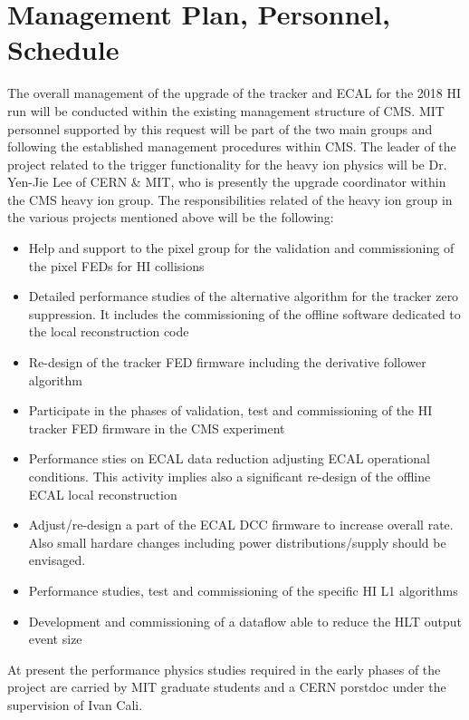 \section{Management Plan, Personnel, Schedule}
\label{sec:management}

The overall management of the upgrade of the tracker and ECAL for the 2018 HI run will be conducted within the existing management
structure of CMS. MIT personnel supported by this request will be part of the two main groups and following the
established management procedures within CMS. The leader of the project related to the trigger functionality for
the heavy ion physics will be Dr. Yen-Jie Lee of CERN \& MIT, who is presently the upgrade coordinator within the CMS
heavy ion group. 
The responsibilities related of the heavy ion group in the various projects mentioned above will be the following:

\begin{itemize}
\item Help and support to the pixel group for the validation and commissioning of the pixel FEDs for HI collisions 
\item Detailed performance studies of the alternative algorithm for the tracker zero suppression. It includes the
commissioning of the offline software dedicated to the local reconstruction code

\item Re-design of the tracker FED firmware including the derivative follower algorithm
\item Participate in the phases of validation, test and commissioning of the HI tracker FED firmware in the CMS experiment
\item Performance sties on ECAL data reduction adjusting ECAL operational conditions. This activity implies also a
significant re-design of the offline ECAL local reconstruction
\item Adjust/re-design a part of the ECAL DCC firmware to increase overall rate. Also small hardare changes including power distributions/supply should be envisaged. 
\item Performance studies, test and commissioning of the specific HI L1 algorithms 
\item Development and commissioning of a dataflow able to reduce the HLT output event size

\end{itemize}

At present the performance physics studies required in the early phases of the project are carried by MIT graduate
students and a CERN porstdoc under the supervision of Ivan Cali. 

